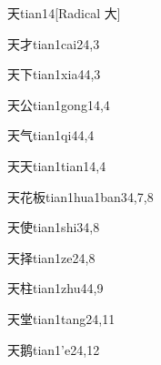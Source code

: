 \begin{verbete}{天}{tian1}{4}[Radical 大]
\end{verbete}

\begin{verbete}{天才}{tian1cai2}{4,3}
\end{verbete}

\begin{verbete}{天下}{tian1xia4}{4,3}
\end{verbete}

\begin{verbete}{天公}{tian1gong1}{4,4}
\end{verbete}

\begin{verbete}{天气}{tian1qi4}{4,4}
\end{verbete}

\begin{verbete}{天天}{tian1tian1}{4,4}
\end{verbete}

\begin{verbete}{天花板}{tian1hua1ban3}{4,7,8}
\end{verbete}

\begin{verbete}{天使}{tian1shi3}{4,8}
\end{verbete}

\begin{verbete}{天择}{tian1ze2}{4,8}
\end{verbete}

\begin{verbete}{天柱}{tian1zhu4}{4,9}
\end{verbete}

\begin{verbete}{天堂}{tian1tang2}{4,11}
\end{verbete}

\begin{verbete}{天鹅}{tian1'e2}{4,12}
\end{verbete}

